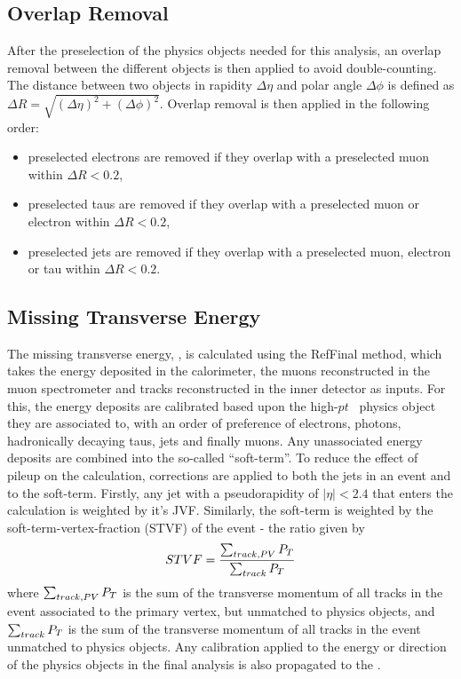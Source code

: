 \subsection{Overlap Removal}
\label{sec:presel:olr}

After the preselection of the physics objects needed for this
analysis, an overlap removal between the different objects is then
applied to avoid double-counting.  The distance between two objects in
rapidity $\Delta\eta$ and polar angle $\Delta\phi$ is defined as
$\Delta R=\sqrt{(\Delta\eta)^2+(\Delta\phi)^2}$. Overlap removal is
then applied in the following order:

\begin{itemize}
\item preselected electrons are removed if they overlap with a preselected muon  within $\Delta R < 0.2$,
\item preselected taus are removed if they overlap with a preselected muon or electron within $\Delta R < 0.2$,
\item preselected jets are removed  if they overlap with a preselected
  muon, electron or tau within \linebreak $\Delta R<0.2$.
\end{itemize}

\subsection{Missing Transverse Energy}
\label{sec:presel:met}

The missing transverse energy, \met, is calculated using the
RefFinal method, which takes the energy
deposited in the calorimeter, the muons reconstructed in the muon
spectrometer and tracks reconstructed in the inner detector as inputs. 
For this, the energy deposits are calibrated based
upon the high-$pt$~ physics object they are associated to, with an order
of preference of electrons, photons, hadronically decaying taus, jets
and finally muons. Any unassociated energy deposits are combined into
the so-called ``soft-term''. To reduce the effect of pileup on the
\met calculation, corrections are applied to both the jets in an event
and to the soft-term. Firstly, any jet with a pseudorapidity of $|\eta|<2.4$
that enters the \met calculation is weighted by it's JVF. Similarly,
the soft-term is weighted by the soft-term-vertex-fraction (STVF) of
the event - the ratio given by
\begin{equation}
STVF = \frac{\sum_{track, PV}P_{T}}{\sum_{track}P_{T}}
\end{equation}
where $\sum_{track, PV}P_{T}$ is the sum of the transverse momentum of
all tracks in the event associated to the primary vertex, but unmatched to physics
objects, and $\sum_{track}P_{T}$ is the sum of
the transverse momentum of all tracks in the event unmatched to
physics objects. Any calibration applied
to the energy or direction of the physics objects in the final
analysis is also propagated to the \met.


